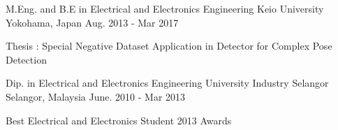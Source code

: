 

\begin{cventries}

  \cventry
    {M.Eng. and B.E in Electrical and Electronics Engineering} %
    {Keio University} %
    {Yokohama, Japan} %
    {Aug. 2013 - Mar 2017} %
    {
      \begin{cvitems} %
        \item { Thesis : Special Negative Dataset Application in Detector for Complex Pose Detection}
      \end{cvitems}
    }

  \cventry
    {Dip. in Electrical and Electronics Engineering} %
    {University Industry Selangor} %
    {Selangor, Malaysia} %
    {June. 2010 - Mar 2013} %
    {
      \begin{cvitems} %
        \item {Best Electrical and Electronics Student 2013 Awards}
      \end{cvitems}
    }

\end{cventries}
